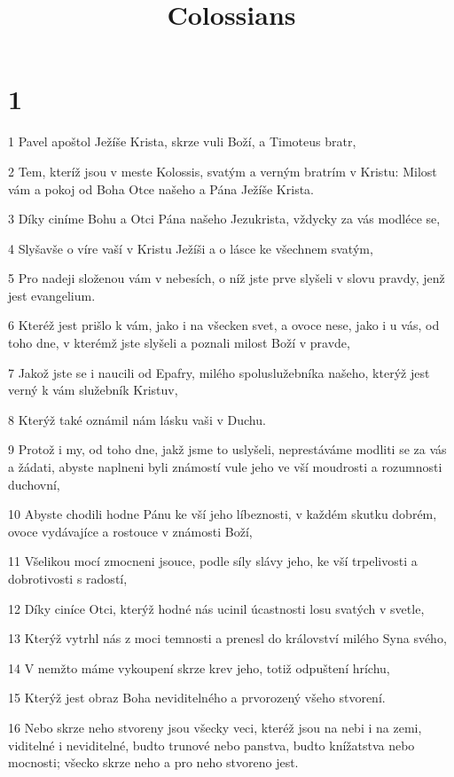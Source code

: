 

\title{Colossians}

\chapter{1}

\par 1 Pavel apoštol Ježíše Krista, skrze vuli Boží, a Timoteus bratr,
\par 2 Tem, kteríž jsou v meste Kolossis, svatým a verným bratrím v Kristu: Milost vám a pokoj od Boha Otce našeho a Pána Ježíše Krista.
\par 3 Díky ciníme Bohu a Otci Pána našeho Jezukrista, vždycky za vás modléce se,
\par 4 Slyšavše o víre vaší v Kristu Ježíši a o lásce ke všechnem svatým,
\par 5 Pro nadeji složenou vám v nebesích, o níž jste prve slyšeli v slovu pravdy, jenž jest evangelium.
\par 6 Kteréž jest prišlo k vám, jako i na všecken svet, a ovoce nese, jako i u vás, od toho dne, v kterémž jste slyšeli a poznali milost Boží v pravde,
\par 7 Jakož jste se i naucili od Epafry, milého spoluslužebníka našeho, kterýž jest verný k vám služebník Kristuv,
\par 8 Kterýž také oznámil nám lásku vaši v Duchu.
\par 9 Protož i my, od toho dne, jakž jsme to uslyšeli, neprestáváme modliti se za vás a žádati, abyste naplneni byli známostí vule jeho ve vší moudrosti a rozumnosti duchovní,
\par 10 Abyste chodili hodne Pánu ke vší jeho líbeznosti, v každém skutku dobrém, ovoce vydávajíce a rostouce v známosti Boží,
\par 11 Všelikou mocí zmocneni jsouce, podle síly slávy jeho, ke vší trpelivosti a dobrotivosti s radostí,
\par 12 Díky ciníce Otci, kterýž hodné nás ucinil úcastnosti losu svatých v svetle,
\par 13 Kterýž vytrhl nás z moci temnosti a prenesl do království milého Syna svého,
\par 14 V nemžto máme vykoupení skrze krev jeho, totiž odpuštení hríchu,
\par 15 Kterýž jest obraz Boha neviditelného a prvorozený všeho stvorení.
\par 16 Nebo skrze neho stvoreny jsou všecky veci, kteréž jsou na nebi i na zemi, viditelné i neviditelné, budto trunové nebo panstva, budto knížatstva nebo mocnosti; všecko skrze neho a pro neho stvoreno jest.
